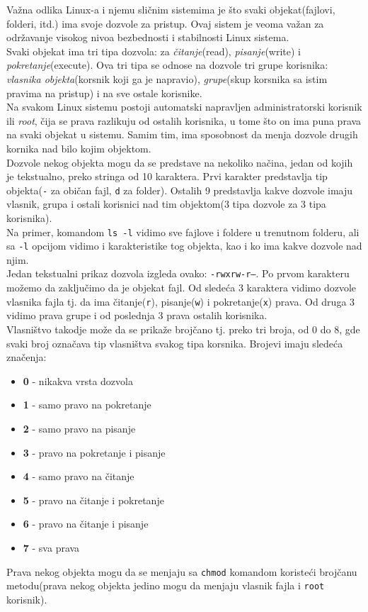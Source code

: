 Važna odlika Linux-a i njemu sličnim sistemima je što svaki objekat(fajlovi, folderi, itd.) ima svoje dozvole za pristup. Ovaj sistem je veoma važan za održavanje visokog nivoa bezbednosti i stabilnosti Linux sistema.\\
Svaki objekat ima tri tipa dozvola: za \textit{čitanje}(read), \textit{pisanje}(write) i \textit{pokretanje}(execute). Ova tri tipa se odnose na dozvole tri grupe korisnika: \textit{vlasnika objekta}(korsnik koji ga je napravio), \textit{grupe}(skup korsnika sa istim pravima na pristup) i na sve ostale korisnike.\\
Na svakom Linux sistemu postoji automatski napravljen administratorski korisnik ili \textit{root}, čija se prava razlikuju od ostalih korisnika, u tome što on ima puna prava na svaki objekat u sistemu. Samim tim, ima sposobnost da menja dozvole drugih kornika nad bilo kojim objektom.\\
Dozvole nekog objekta mogu da se predstave na nekoliko načina, jedan od kojih je tekstualno, preko stringa od 10 karaktera. Prvi karakter predstavlja tip objekta(\texttt{-} za običan fajl, \texttt{d} za folder). Ostalih 9 predstavlja kakve dozvole imaju vlasnik, grupa i ostali korisnici nad tim objektom(3 tipa dozvole za 3 tipa korisnika).\\
Na primer, komandom \texttt{ls -l} vidimo sve fajlove i foldere u trenutnom folderu, ali sa \texttt{-l} opcijom vidimo i karakteristike tog objekta, kao i ko ima kakve dozvole nad njim.\\
Jedan tekstualni prikaz dozvola izgleda ovako: \texttt{-rwxrw-r--}. Po prvom karakteru možemo da zaključimo da je objekat fajl. Od sledeća 3 karaktera vidimo dozvole vlasnika fajla tj. da ima čitanje(\texttt{r}), pisanje(\texttt{w}) i pokretanje(\texttt{x}) prava. Od druga 3 vidimo prava grupe i od poslednja 3 prava ostalih korisnika.\\
Vlasništvo takodje može da se prikaže brojčano tj. preko tri broja, od 0 do 8, gde svaki broj označava tip vlasništva svakog tipa korsnika. Brojevi imaju sledeća značenja:
\begin{itemize}
\item \textbf{0} - nikakva vrsta dozvola
\item \textbf{1} - samo pravo na pokretanje
\item \textbf{2} - samo pravo na pisanje
\item \textbf{3} - pravo na pokretanje i pisanje
\item \textbf{4} - samo pravo na čitanje
\item \textbf{5} - pravo na čitanje i pokretanje
\item \textbf{6} - pravo na čitanje i pisanje
\item \textbf{7} - sva prava
\end{itemize}
Prava nekog objekta mogu da se menjaju sa \texttt{chmod} komandom koristeći brojčanu metodu(prava nekog objekta jedino mogu da menjaju vlasnik fajla i \texttt{root} korisnik).